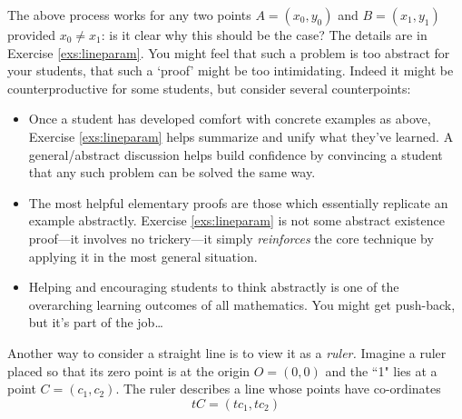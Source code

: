 The above process works for any two points $A=(x_0,y_0)$ and $B=(x_1,y_1)$ provided $x_0\neq x_1$: is it clear why this should be the case? The details are in Exercise \ref{exs:lineparam}. You might feel that such a problem is too abstract for your students, that such a `proof' might be too intimidating. Indeed it might be counterproductive for some students, but consider several counterpoints:
\begin{itemize}
  \item Once a student has developed comfort with concrete examples as above, Exercise \ref{exs:lineparam} helps summarize and unify what they've learned. A general/abstract discussion helps build confidence by convincing a student that any such problem can be solved the same way.
  \item The most helpful elementary proofs are those which essentially replicate an example abstractly. Exercise \ref{exs:lineparam} is not some abstract existence proof---it involves no trickery---it simply \emph{reinforces} the core technique by applying it in the most general situation.
  \item Helping and encouraging students to think abstractly is one of the overarching learning outcomes of all mathematics. You might get push-back, but it's part of the job\ldots
\end{itemize}


\goodbreak


\label{sec:paramline}

Another way to consider a straight line is to view it as a \emph{ruler.} Imagine a ruler placed so that its zero point is at the origin $O=(0,0)$ and the ``1" lies at a point $C=(c_1,c_2)$. The ruler describes a line whose points have co-ordinates
\[
	tC=(tc_1,tc_2) \tag{$\ast$}
\]


